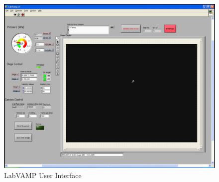 \begin{figure}[htbp]
	\centering
		\includegraphics[width=1.00\textwidth]{figs/labvamp_ui.pdf}
	\caption{LabVAMP User Interface}
	\label{fig:labvampui}
\end{figure}

